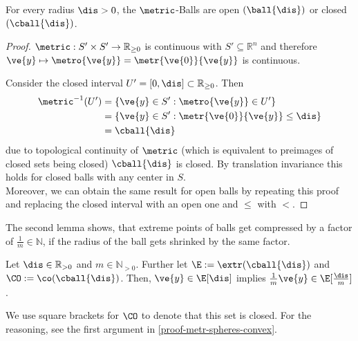 \begin{lem} \label{lemma-delta-balls-closed}
	For every radius $\dis > 0$, the $\metric$-Balls are open $(\ball{\dis})$ or closed $(\cball{\dis})$.
\end{lem}

\begin{proof}
  $\metric : S' \times S' \to \mathbb{R}_{\geq 0}$ is continuous with $S' \subseteq \mathbb{R}^n$ and therefore $\ve{y} \mapsto \metro{\ve{y}} = \metr{\ve{0}}{\ve{y}}$ is continuous.

	Consider the closed interval $U' = [0, \dis] \subset \mathbb{R}_{\geq 0}$.
	Then
	\begin{align*}
    \metric^{-1}(U') & = \{\ve{y} \in S' : \metro{\ve{y}} \in U'\}        \\
                     & = \{\ve{y} \in S' : \metr{\ve{0}}{\ve{y}} \leq \dis\} \\
		                 & = \cball{\dis}
	\end{align*}
	due to topological continuity of $\metric$ (which is equivalent to preimages of closed sets being closed) $\cball{\dis}$ is closed. By translation invariance this holds for closed balls with any center in $S$.\\
	Moreover, we can obtain the same result for open balls by repeating this proof and replacing the closed interval with an open one and $\leq$ with $<$.
\end{proof}

The second lemma shows, that extreme points of balls get compressed by a factor of $\frac{1}{m} \in \mathbb{N}$, if the radius of the ball gets shrinked by the same factor.

\begin{lem} \label{lem-compr-extr-points}
	Let $\dis \in \mathbb{R}_{> 0}$ and $m \in \mathbb{N}_{>0}$. Further let $\E := \extr ( \cball{\dis})$ and $\CO := \co(\cball{\dis})$.
  Then, $\ve{y} \in \E[\dis]$ implies $\frac{1}{m}\ve{y} \in \E[\frac{\dis}{m}]$.
\end{lem}

\begin{rem*}
  We use square brackets for $\CO$ to denote that this set is closed. For the reasoning, see the first argument in \cref{proof-metr-spheres-convex}.
\end{rem*}

